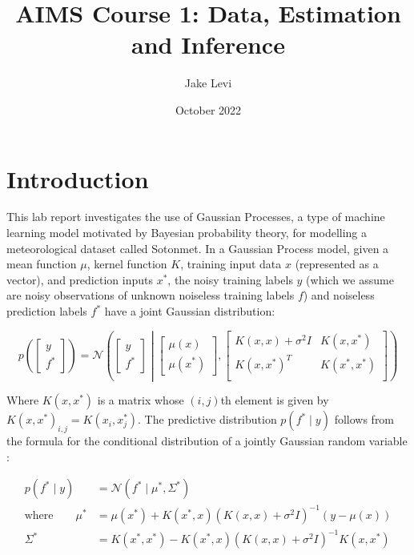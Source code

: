 \documentclass{article}
\title{AIMS Course 1: Data, Estimation and Inference}
\author{Jake Levi}
\date{October 2022}
\begin{document}
\maketitle
\section{Introduction}

This lab report investigates the use of Gaussian Processes, a type of machine learning model motivated by Bayesian probability theory, for modelling a meteorological dataset called Sotonmet. In a Gaussian Process model, given a mean function $\mu$, kernel function $K$, training input data $x$ (represented as a vector), and prediction inputs $x^*$, the noisy training labels $y$ (which we assume are noisy observations of unknown noiseless training labels $f$) and noiseless prediction labels $f^*$ have a joint Gaussian distribution:

\begin{equation}
    p\left( \begin{bmatrix}
        y \\
        f^*
    \end{bmatrix} \right)
    = \mathcal{N} \left( \begin{bmatrix}
        y \\
        f^*
    \end{bmatrix} \middle| \begin{bmatrix}
        \mu(x) \\
        \mu(x^*)
    \end{bmatrix}, \begin{bmatrix}
        K(x, x) + \sigma^2 I & K(x, x^*) \\
        K(x, x^*)^T & K(x^*, x^*) \\
    \end{bmatrix} \right)
\end{equation}

Where $K(x, x^*)$ is a matrix whose $(i, j)$th element is given by $K(x, x^*)_{i,j} = K(x_i, x^*_j)$. The predictive distribution $p(f^* \mid y)$ follows from the formula for the conditional distribution of a jointly Gaussian random variable \cite{bishop2006pattern}:

\begin{align}
    p(f^* \mid y) &= \mathcal{N}\left(f^* \mid \mu^*, \Sigma^* \right) \\
    \text{where} \qquad \mu^* &= \mu(x^*) + K(x^*, x) \left( K(x, x) + \sigma^2 I \right)^{-1} (y - \mu(x)) \\
    \Sigma^* &= K(x^*, x^*) - K(x^*, x) \left( K(x, x) + \sigma^2 I \right) ^{-1} K(x, x^*)
\end{align}
\end{document}
